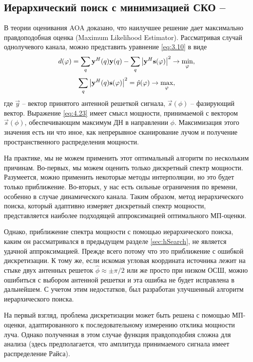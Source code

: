 \subsection[Иерархический поиск с минимизацией СКО]{Иерархический поиск с минимизацией СКО -- \hSearchMMSE}
\label{sec:hSearchMMSE:singlepath}
В теории оценивания AOA доказано, что наилучшее решение дает максимально правдоподобная оценка (Maximum Likelihood Estimator).
Рассматривая случай однолучевого канала, можно представить уравнение \eqref{eq:3.10} в виде
\begin{equation}
    d(\phi) = \sum\limits_q \vec y^H(q) \vec y(q) - \sum\limits_q\abs{\vec y^H \vec s(\phi)}^2 \to \min_\phi,
\end{equation}
\begin{equation}
    \label{eq:4.23}
    \sum\limits_q \abs{\vec y^H(q) \vec s(\phi)}^2 = \hat p(\phi) \to \max_\phi,
\end{equation}
где $\vec y$ -- вектор принятого антенной решеткой сигнала, $\vec s(\phi)$ --
фазирующий вектор. Выражение \eqref{eq:4.23} имеет смысл мощности,
принимаемой с  вектором $\vec s(\phi)$, обеспечивающим максимум ДН в направлении
$\phi$. Максимизация этого значения есть ни что иное, как непрерывное
сканирование лучом и получение пространственного распределения мощности.

На практике, мы не можем применить этот оптимальный алгоритм по нескольким
причинам. Во-первых, мы  можем оценить только дискретный спектр мощности.
Разумеется, можно применить некоторые методы интерполяции, но это будет только
приближение.  Во-вторых, у нас есть сильные ограничения по времени, особенно в
случае динамического канала.  Таким образом, метод иерархического поиска,
который адаптивно измеряет дискретный спектр мощности, представляется наиболее
подходящей аппроксимацией оптимального МП-оценки.

Однако, приближение спектра мощности с помощью иерархического
поиска, каким он рассматривался в предыдущем разделе \eqref{sec:hSearch}, не
является удачной аппроксимацией.  Прежде всего потому что это приближение с
ошибкой дискретизации. К тому же, если искомая угловая координата источника
лежит на стыке  двух антенных решеток $\hat \phi \approx \pm \pi/2$ или же просто
при низком ОСШ,  можно ошибиться с выбором антенной решетки и эта ошибка не
будет исправлена в дальнейшем. С учетом этим недостатков, был разработан
улучшенный алгоритм иерархического поиска.

На первый взгляд, проблема дискретизации может быть решена с помощью
МП-оценки, адаптированного к последовательному измерению отклика мощности
луча. Однако полученная в этом случае функция правдоподобия сложна для анализа
(здесь предполагается, что амплитуда принимаемого сигнала имеет распределение
Райса).

